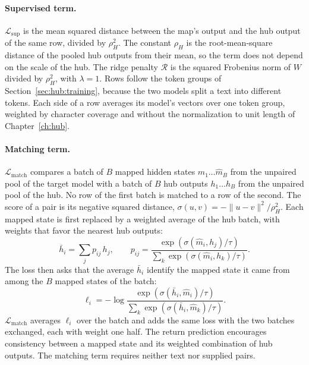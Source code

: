 \paragraph{Supervised term.} $\mathcal{L}_{\text{sup}}$ is the mean squared distance between the map's output and the hub output of the same row, divided by $\rho_H^2$.
The constant $\rho_H$ is the root-mean-square distance of the pooled hub outputs from their mean, so the term does not depend on the scale of the hub. %
The ridge penalty $\mathcal{R}$ is the squared Frobenius norm of $W$ divided by $\rho_H^2$, with $\lambda = 1$. %
Rows follow the token groups of Section~\ref{sec:hub:training}, because the two models split a text into different tokens.
Each side of a row averages its model's vectors over one token group, weighted by character coverage and without the normalization to unit length of Chapter~\ref{ch:hub}. %

\paragraph{Matching term.} $\mathcal{L}_{\text{match}}$ compares a batch of $B$ mapped hidden states $\hat m_1 \ldots \hat m_B$ from the unpaired pool of the target model with a batch of $B$ hub outputs $h_1 \ldots h_B$ from the unpaired pool of the hub.
No row of the first batch is matched to a row of the second.
The score of a pair is its negative squared distance, $\sigma(u, v) = -\lVert u - v\rVert^2 / \rho_H^2$.
Each mapped state is first replaced by a weighted average of the hub batch, with weights that favor the nearest hub outputs:
\begin{equation}
\bar h_i = \sum_{j} p_{ij}\, h_j ,
\qquad
p_{ij} = \frac{\exp(\sigma(\hat m_i, h_j)/\tau)}{\sum_{k}\exp(\sigma(\hat m_i, h_k)/\tau)} .
\label{eq:attack:match}
\end{equation}
The loss then asks that the average $\bar h_i$ identify the mapped state it came from among the $B$ mapped states of the batch:
\begin{equation}
\ell_i = -\log\frac{\exp(\sigma(\bar h_i, \hat m_i)/\tau)}{\sum_{k}\exp(\sigma(\bar h_i, \hat m_k)/\tau)} .
\label{eq:attack:return}
\end{equation}
$\mathcal{L}_{\text{match}}$ averages $\ell_i$ over the batch and adds the same loss with the two batches exchanged, each with weight one half. %
The return prediction encourages consistency between a mapped state and its weighted combination of hub outputs.
The matching term requires neither text nor supplied pairs.

